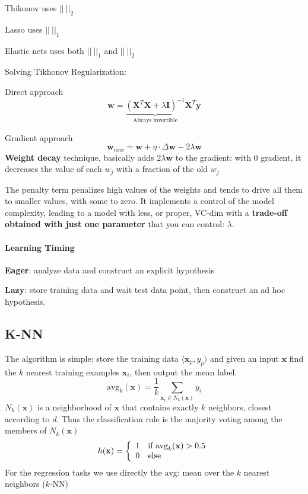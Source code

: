 \documentclass[10pt]{report}
\begin{document}
\begin{list}{}{}
	\item Thikonov uses $||\:||_2$
	\item Lasso uses $||\:||_1$
	\item Elastic nets uses both $||\:||_1$ and $||\:||_2$
\end{list}
Solving Tikhonov Regularization:
\begin{list}{}{}
	\item Direct approach
	$$\mathbf{w} = \underset{\text{Always invertible}}{\underbrace{(\mathbf{X}^T\mathbf{X}+\lambda\mathbf{I})^{-1}}}\mathbf{X}^T\mathbf{y}$$
	\item Gradient approach
	$$\mathbf{w}_{new} = \mathbf{w}+\eta\cdot\Delta\mathbf{w} - 2\lambda\mathbf{w}$$
	\textbf{Weight decay} technique, basically adds $2\lambda\mathbf{w}$ to the gradient: with 0 gradient, it decreases the value of each $w_j$ with a fraction of the old $w_j$
\end{list}
The penalty term penalizes high values of the weights and tends to drive all them to smaller values, with some to zero. It implements a control of the model complexity, leading to a model with less, or proper, VC-dim with a \textbf{trade-off obtained with just one parameter} that you can control: $\lambda$.
\paragraph{Learning Timing} \begin{list}{}{}
	\item \textbf{Eager}: analyze data and construct an explicit hypothesis
	\item \textbf{Lazy}: store training data and wait test data point, then construct an ad hoc hypothesis.
\end{list}
\pagebreak
\subsection{K-NN}
The algorithm is simple: store the training data $\langle\mathbf{x}_p, y_p\rangle$ and given an input $\mathbf{x}$ find the $k$ nearest training examples $\mathbf{x}_i$, then output the mean label.
$$\text{avg}_k(\mathbf{x})=\frac{1}{k}\sum_{\mathbf{x}_i\in N_k(\mathbf{x})}y_i$$
$N_k(\mathbf{x})$ is a neighborhood of $\mathbf{x}$ that contains exactly $k$ neighbors, closest according to $d$. Thus the classification rule is the majority voting among the members of $N_k(\mathbf{x})$
$$h(\mathbf{x})=\left\{\begin{array}{c l}
1&\text{if }\text{avg}_k(\mathbf{x})>0.5\\
0&\text{else}
\end{array}\right.$$
For the regression tasks we use directly the $\text{avg}$: mean over the $k$ nearest neighbors ($k$-NN)
\end{document}
